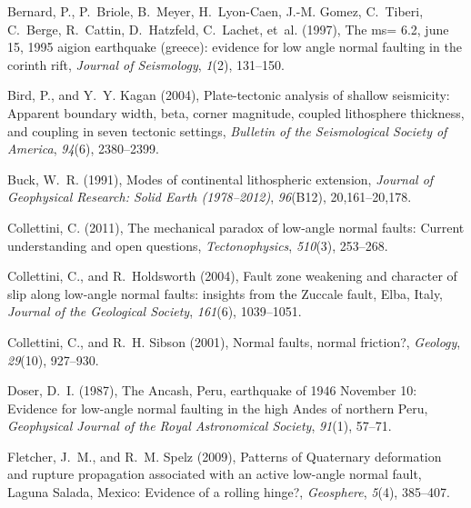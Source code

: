 \documentclass[twocolumn,grl]{AGUTeX}
\begin{document}
\begin{article}
\begin{thebibliography}{30}
Bernard, P., P.~Briole, B.~Meyer, H.~Lyon-Caen, J.-M. Gomez, C.~Tiberi,
  C.~Berge, R.~Cattin, D.~Hatzfeld, C.~Lachet, et~al. (1997), The ms= 6.2, june
  15, 1995 aigion earthquake (greece): evidence for low angle normal faulting
  in the corinth rift, \textit{Journal of Seismology}, \textit{1}(2), 131--150.

Bird, P., and Y.~Y. Kagan (2004), Plate-tectonic analysis of shallow
  seismicity: Apparent boundary width, beta, corner magnitude, coupled
  lithosphere thickness, and coupling in seven tectonic settings,
  \textit{Bulletin of the Seismological Society of America}, \textit{94}(6),
  2380--2399.

Buck, W.~R. (1991), Modes of continental lithospheric extension,
  \textit{Journal of Geophysical Research: Solid Earth (1978--2012)},
  \textit{96}(B12), 20,161--20,178.

Collettini, C. (2011), The mechanical paradox of low-angle normal faults:
  Current understanding and open questions, \textit{Tectonophysics},
  \textit{510}(3), 253--268.

Collettini, C., and R.~Holdsworth (2004), Fault zone weakening and character of
  slip along low-angle normal faults: insights from the {Z}uccale fault,
  {E}lba, {I}taly, \textit{Journal of the Geological Society}, \textit{161}(6),
  1039--1051.

Collettini, C., and R.~H. Sibson (2001), Normal faults, normal friction?,
  \textit{Geology}, \textit{29}(10), 927--930.

	Doser, D.~I. (1987), The {A}ncash, {P}eru, earthquake of 1946 {N}ovember
10: Evidence for low-angle normal faulting in the high {A}ndes of northern
	{P}eru, \textit{Geophysical Journal of the Royal Astronomical Society},
	\textit{91}(1), 57--71.

Fletcher, J.~M., and R.~M. Spelz (2009), Patterns of {Q}uaternary deformation
  and rupture propagation associated with an active low-angle normal fault,
  {L}aguna {S}alada, {M}exico: Evidence of a rolling hinge?,
  \textit{Geosphere}, \textit{5}(4), 385--407.


\end{thebibliography}
\end{article}
\end{document}
